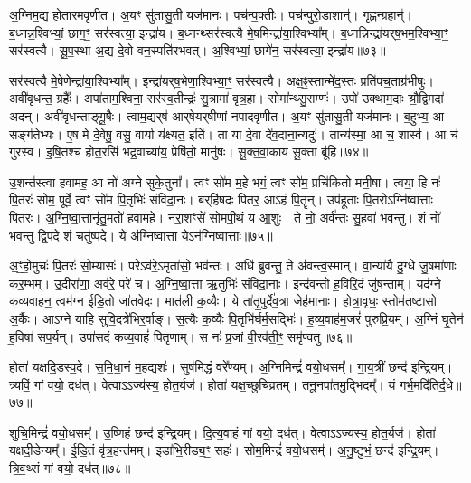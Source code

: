 अ॒ग्निम॒द्य होता॑रमवृणीत।
अ॒यꣳ सु॑तासु॒ती यज॑मानः।
पच॑न्प॒क्तीः।
पच॑न्पुरो॒डाशान्॑।
गृ॒ह्णन्ग्रहान्॑।
ब॒ध्नन्न॒श्विभ्यां॒ छाग॒ꣳ॒ सर॑स्वत्या॒ इन्द्रा॑य।
ब॒ध्नन्थ्सर॑स्वत्यै मे॒षमिन्द्रा॑या॒श्वि\-भ्या᳚म्।
ब॒ध्नन्निन्द्रा॑यर्‌\mbox{}ष॒भम॒श्विभ्या॒ꣳ॒ सर॑स्वत्यै।
सू॒प॒स्था अ॒द्य दे॒वो वन॒स्पति॑रभवत्।
अ॒श्विभ्यां॒ छागे॑न॒ सर॑स्वत्या॒ इन्द्रा॑य॥७३॥

सर॑स्वत्यै मे॒षेणेन्द्रा॑या॒श्विभ्या᳚म्।
इन्द्रा॑यर्‌\mbox{}ष॒भेणा॒श्विभ्या॒ꣳ॒ सर॑स्वत्यै।
अक्ष॒ꣴ॒स्तान्मे॑द॒स्तः प्रति॑\-पच॒ताग्र॑भीषुः।
अवी॑वृधन्त॒ ग्रहैः᳚।
अपा॑ता\-म॒श्विना॒ सर॑स्व॒तीन्द्रः॑ सु॒त्रामा॑ वृत्र॒हा।
सोमा᳚न्थ्सु॒राम्णः॑।
उपो॑ उक्थाम॒दाः श्रौ॒द्विमदा॑ अदन्।
अवी॑वृधन्ताङ्गू॒षैः।
त्वाम॒द्यर्‌\mbox{}ष॑ आर्‌\mbox{}षेयर्‌\mbox{}षीणां नपादवृणीत।
अ॒यꣳ सु॑तासु॒ती यज॑मानः।
ब॒हुभ्य॒ आ सङ्ग॑तेभ्यः।
ए॒ष मे॑ दे॒वेषु॒ वसु॒ वार्या य॑क्ष्यत॒ इति॑।
ता या दे॒वा दे॑व॒दाना॒न्यदुः॑।
तान्य॑स्मा॒ आ च॒ शास्व॑।
आ च॑ गुरस्व।
इ॒षि॒तश्च॑ होत॒रसि॑ भद्र॒वाच्या॑य॒ प्रेषि॑तो॒ मानु॑षः।
सू॒क्त॒वा॒काय॑ सू॒क्ता ब्रू॑हि॥७४॥\anuvakamend[इन्द्रा॑य॒ यज॑मानः स॒प्त च॑]

उ॒शन्त॑स्त्वा हवामह॒ आ नो॑ अग्ने सुके॒तुना᳚।
त्वꣳ सो॑म म॒हे भगं॒ त्वꣳ सो॑म॒ प्रचि॑कितो मनी॒षा।
त्वया॒ हि नः॑ पि॒तरः॑ सोम॒ पूर्वे॒ त्वꣳ सो॑म पि॒तृभिः॑ संविदा॒नः।
बर्‌\mbox{}हि॑षदः पितर॒ आऽहं पि॒तॄन्।
उप॑हूताः पि॒तरो\-ऽग्नि॑ष्वात्ताः पितरः।
अ॒ग्नि॒ष्वा॒त्तानृ॑तु॒मतो॑ हवामहे।
नरा॒शꣳसे॑ सोमपी॒थं य आ॒शुः।
ते नो॒ अर्व॑न्तः सु॒हवा॑ भवन्तु।
शं नो॑ भवन्तु द्वि॒पदे॒ शं चतु॑ष्पदे।
ये अ॑ग्निष्वा॒त्ता येऽन॑ग्निष्वात्ताः॥७५॥

अ॒ꣳ॒हो॒मुचः॑ पि॒तरः॑ सो॒म्यासः॑।
परेऽव॑रे॒\-ऽमृता॑सो॒ भव॑न्तः।
अधि॑ ब्रुवन्तु॒ ते अ॑वन्त्व॒स्मान्।
वा॒न्या॑यै दु॒ग्धे जु॒षमा॑णाः कर॒म्भम्।
उ॒दीरा॑णा॒ अव॑रे॒ परे॑ च।
अ॒ग्नि॒ष्वा॒त्ता ऋ॒तुभिः॑ संविदा॒नाः।
इन्द्र॑वन्तो ह॒विरि॒दं जु॑षन्ताम्।
यद॑ग्ने कव्यवाहन॒ त्वम॑ग्न ईडि॒तो जा॑तवेदः।
मात॑ली क॒व्यैः।
ये ता॑तृ॒पुर्दे॑व॒त्रा जेह॑मानाः।
हो॒त्रा॒वृधः॒ स्तोम॑तष्टासो अ॒र्कैः।
आऽग्ने॑ याहि सुवि॒दत्रे॑भिर॒र्वाङ्।
स॒त्यैः क॒व्यैः पि॒तृभि॑र्घर्म॒सद्भिः॑।
ह॒व्य॒वाह॑म॒जरं॑ पुरुप्रि॒यम्।
अ॒ग्निं घृ॒तेन॑ ह॒विषा॑ सप॒र्यन्।
उपा॑सदं कव्य॒वाहं॑ पितृ॒णाम्।
स नः॑ प्र॒जां वी॒रव॑ती॒ꣳ॒ समृ॑ण्वतु॥७६॥\anuvakamend[अन॑ग्निष्वात्ता॒ जेह॑मानाः स॒प्त च॑]

होता॑ यक्षदि॒डस्प॒दे।
स॒मि॒धा॒नं म॒हद्यशः॑।
सुष॑मिद्धं॒ वरे᳚ण्यम्।
अ॒ग्निमिन्द्रं॑ वयो॒धसम्᳚।
गा॒य॒त्रीं छन्द॑ इन्द्रि॒यम्।
त्र्यविं॒ गां वयो॒ दध॑त्।
वेत्वा\-ऽ\-ऽ\-ज्य॑स्य॒ होत॒र्यज॑।
होता॑ यक्ष॒च्छुचि॑व्रतम्।
तनू॒नपा॑तमु॒द्भिदम्᳚।
यं गर्भ॒मदि॑तिर्द॒धे॥७७॥

शुचि॒मिन्द्रं॑ वयो॒धसम्᳚।
उ॒ष्णिहं॒ छन्द॑ इन्द्रि॒यम्।
दि॒त्य॒वाहं॒ गां वयो॒ दध॑त्।
वेत्वा\-ऽ\-ऽ\-ज्य॑स्य॒ होत॒र्यज॑।
होता॑ यक्षदी॒डेन्यम्᳚।
ई॒डि॒तं वृ॑त्र॒हन्त॑मम्।
इडा॑भि॒रीड्य॒ꣳ॒ सहः॑।
सोम॒मिन्द्रं॑ वयो॒धसम्᳚।
अ॒नु॒ष्टुभं॒ छन्द॑ इन्द्रि॒यम्।
त्रि॒व॒थ्सं गां वयो॒ दध॑त्॥७८॥

